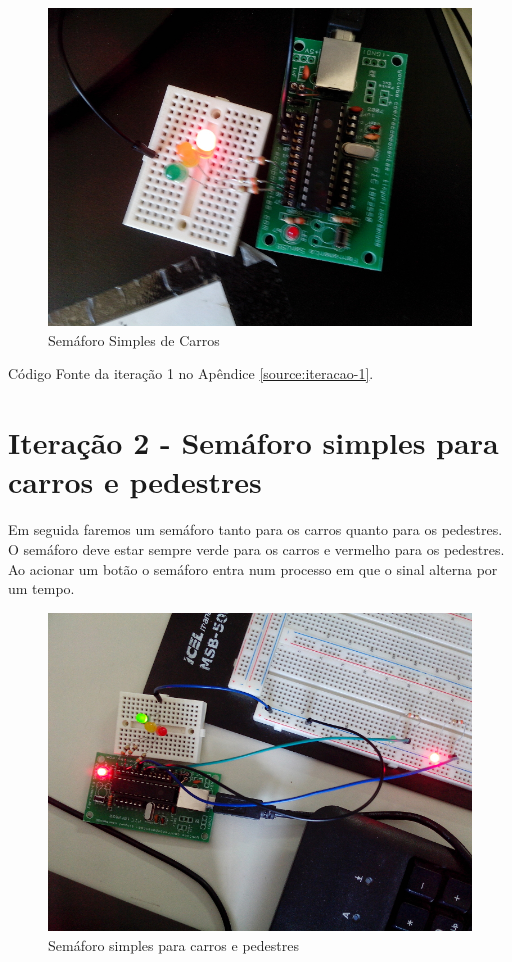 \begin{figure}[h]
    \includegraphics[scale=0.5]{img/semaforo-1.jpg}
    \caption{Semáforo Simples de Carros} \label{fig:semaforo-1}
\end{figure}

Código Fonte da iteração 1 no Apêndice \ref{source:iteracao-1}.

\section{Iteração 2 - Semáforo simples para carros e
pedestres}\label{iterauxe7uxe3o-2---semuxe1foro-simples-para-carros-e-pedestres}

Em seguida faremos um semáforo tanto para os carros quanto para os
pedestres. O semáforo deve estar sempre verde para os carros e vermelho
para os pedestres. Ao acionar um botão o semáforo entra num processo em
que o sinal alterna por um tempo.

\begin{figure}[H]
    \includegraphics[scale=0.5]{img/semaforo-2.jpg}
    \caption{Semáforo simples para carros e pedestres}
\end{figure}

